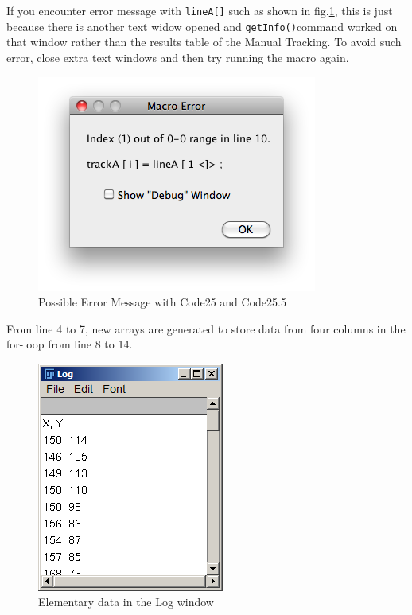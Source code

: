 \documentclass[11pt,a4paper,oneside]{report}
\newcommand{\ilcom}[1]{\texttt{\small#1}}
\begin{document}
If you encounter error message with \ilcom{lineA[]} such as shown in fig.\ref{fig:fig262_ErrorMessage}, 
this is just because there is another text widow opened and \ilcom{getInfo()}command worked on 
that window rather than the results table of the Manual Tracking. To avoid such error, 
close extra text windows and then try running the macro again. 
\begin{figure}[htbp]
\begin{center}
\includegraphics[scale=0.6]{fig/fig262_PossibleErrorMessage.png}
\caption{Possible Error Message with Code25 and Code25.5}
\label{fig:fig262_ErrorMessage}
\end{center}
\end{figure}

From line 4 to 7, new arrays are generated to store data from four columns in the for-loop from line 8 to 14. 

\begin{figure}[htbp]
\begin{center}
\includegraphics[scale=0.6]{fig/fig253_CoordinatesPrintedOut.png}
\caption{Elementary data in the Log window}
\label{fig:fig253_CoordinatesPrintedOut}
\end{center}
\end{figure}
\end{document}
